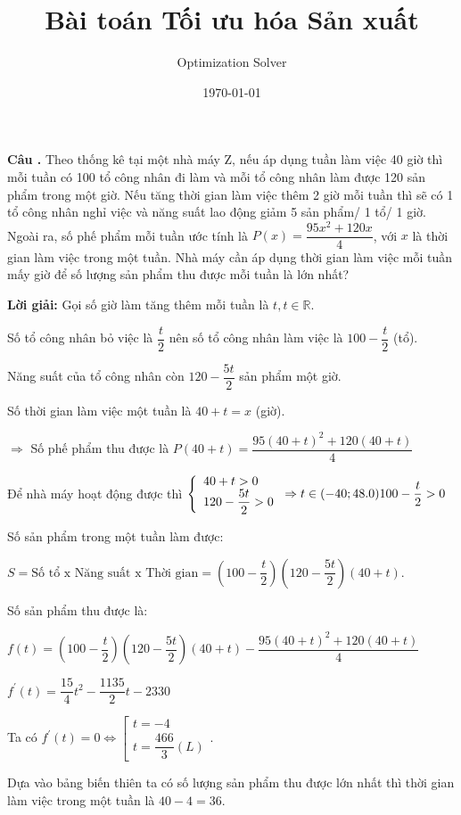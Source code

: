 \documentclass[12pt]{article}
\title{Bài toán Tối ưu hóa Sản xuất}
\author{Optimization Solver}
\date{\today}
\newcounter{ex}
\newenvironment{ex}{\refstepcounter{ex}\textbf{Câu \theex.} }{\vspace{0.5cm}}
\newcommand{\loigiai}[1]{\textbf{Lời giải:} #1}
\begin{document}
\maketitle

\begin{ex} 
Theo thống kê tại một nhà máy Z, nếu áp dụng tuần làm việc 40 giờ thì mỗi tuần có 100 tổ công nhân đi làm và mỗi tổ công nhân làm được 120 sản phẩm trong một giờ. Nếu tăng thời gian làm việc thêm 2 giờ mỗi tuần thì sẽ có 1 tổ công nhân nghỉ việc và năng suất lao động giảm 5 sản phẩm/ 1 tổ/ 1 giờ. Ngoài ra, số phế phẩm mỗi tuần ước tính là \(P(x)=\dfrac{95 x^2+120 x}{4}\), với \(x\) là thời gian làm việc trong một tuần. Nhà máy cần áp dụng thời gian làm việc mỗi tuần mấy giờ để số lượng sản phẩm thu được mỗi tuần là lớn nhất?

\loigiai{
	Gọi số giờ làm tăng thêm mỗi tuần là \(t, t \in \mathbb{R}\). 
	
	Số tổ công nhân bỏ việc là \(\dfrac{t}{2}\) nên số tổ công nhân làm việc là \(100-\dfrac{t}{2}\) (tổ). 
	
	Năng suất của tổ công nhân còn \(120-\dfrac{5 t}{2}\) sản phẩm một giờ. 
	
	Số thời gian làm việc một tuần là \(40+t=x\) (giờ).
	
	\(\Rightarrow\) Số phế phẩm thu được là \(P(40+t)=\dfrac{95(40+t)^2+120(40+t)}{4}\)
	
	Để nhà máy hoạt động được thì \(\left\{\begin{array}{l}40+t>0 \\ 120-\dfrac{5 t}{2}>0\end{array}\right. \Rightarrow t \in(-40 ; 48.0) \\
	100-\dfrac{t}{2}>0\)
	
	Số sản phẩm trong một tuần làm được: 
	
	\(S=\text{Số tổ x Năng suất x Thời gian}= \left(100-\dfrac{t}{2}\right)\left(120-\dfrac{5 t}{2}\right)(40+t)\). 
	
	Số sản phẩm thu được là:
	
	\(
	f(t)  =\left(100-\dfrac{t}{2}\right)\left(120-\dfrac{5 t}{2}\right)(40+t)-\dfrac{95(40+t)^2+120(40+t)}{4} \)
	
	\(f^{\prime}(t) = \dfrac{15}{4} t^2-\dfrac{1135}{2} t-2330\)
	
	Ta có \(f^{\prime}(t)=0 \Leftrightarrow\left[\begin{array}{l}t=-4 \\ t=\dfrac{466}{3}(L)\end{array}\right.\). 
	
	Dựa vào bảng biến thiên ta có số lượng sản phẩm thu được lớn nhất thì thời gian làm việc trong một tuần là \(40-4=36\).
	
}
\end{ex}
\end{document}
